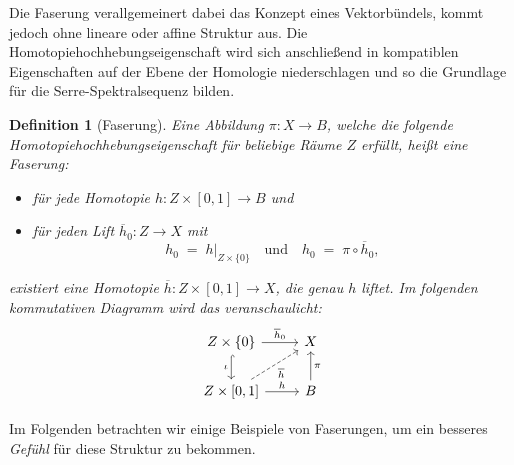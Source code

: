 \documentclass[12pt, hidelinks]{article}
\numberwithin{conj}{section}
\newtheorem{definition}[conj]{Definition}
\begin{document}
Die Faserung verallgemeinert dabei das Konzept eines Vektorbündels, kommt jedoch ohne lineare oder affine Struktur aus. Die Homotopiehochhebungseigenschaft wird sich anschließend in kompatiblen Eigenschaften auf der Ebene der Homologie niederschlagen und so die Grundlage für die Serre-Spektralsequenz bilden.

\begin{definition}[Faserung]
Eine Abbildung \(\pi : X \to B\), welche die folgende \emph{Homotopiehochhebungseigenschaft} für beliebige Räume \(Z\) erfüllt, heißt eine \emph{Faserung}:
\begin{itemize}[noitemsep]
    \item für jede Homotopie \(h : Z \times [0,1] \to B\) und
    \item für jeden Lift \(\overline{h}_0 : Z \to X\) mit 
    \[
        h_0 \;=\; h\vert_{Z\times \{0\}}
        \quad\text{und}\quad 
        h_0 \;=\; \pi \circ \overline{h}_0,
    \]
\end{itemize}
existiert eine \emph{Homotopie} \(\overline{h} : Z \times [0,1] \to X\), die genau \(h\) \emph{liftet}. Im folgenden kommutativen Diagramm wird das veranschaulicht:
\[
\begin{tikzcd}
    {Z \times \{0\}} \arrow[hook]{d}[swap]{\iota} 
    \arrow{r}{\overline{h}_0}
    & X \\
    {Z\times[0,1]} \arrow[dashed]{ur}[swap]{\overline{h}}
    \arrow{r}{h}
    & B \arrow{u}[swap]{\pi}
\end{tikzcd}
\]
\end{definition}

\noindent
Im Folgenden betrachten wir einige Beispiele von Faserungen, um ein besseres \emph{Gefühl} für diese Struktur zu bekommen.
\end{document}
